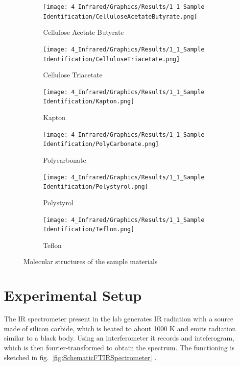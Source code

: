 \documentclass[12pt]{article}
\begin{document}
\begin{figure}[!ht]
    \begin{subfigure}[c]{0.5\textwidth}
        \centering
        \texttt{[image: 4\_Infrared/Graphics/Results/1\_1\_Sample Identification/CelluloseAcetateButyrate.png]}
        \caption{Cellulose Acetate Butyrate}
    \label{fig:StructureCelluloseAcetateButyrate}
    \end{subfigure}
    \hfill
    \begin{subfigure}[c]{0.5\textwidth}
        \centering
        \texttt{[image: 4\_Infrared/Graphics/Results/1\_1\_Sample Identification/CelluloseTriacetate.png]}
        \caption{Cellulose Triacetate}
    \label{fig:StructureCelluloseTriacetate}
    \end{subfigure}
    \hfill
    \begin{subfigure}[c]{0.5\textwidth}
        \centering
        \texttt{[image: 4\_Infrared/Graphics/Results/1\_1\_Sample Identification/Kapton.png]}
        \caption{Kapton}
    \label{fig:StructureKapton}
    \end{subfigure}
    \hfill
    \begin{subfigure}[c]{0.5\textwidth}
        \centering
        \texttt{[image: 4\_Infrared/Graphics/Results/1\_1\_Sample Identification/PolyCarbonate.png]}
        \caption{Polycarbonate}
    \label{fig:StructurePolycarbonate}
    \end{subfigure}
    \hfill
    \begin{subfigure}[c]{0.5\textwidth}
        \centering
        \texttt{[image: 4\_Infrared/Graphics/Results/1\_1\_Sample Identification/Polystyrol.png]}
        \caption{Polystyrol}
    \label{fig:StructurePolystyrol}
    \end{subfigure}
    \hfill
    \begin{subfigure}[c]{0.5\textwidth}
        \centering
        \texttt{[image: 4\_Infrared/Graphics/Results/1\_1\_Sample Identification/Teflon.png]}
        \caption{Teflon}
    \label{fig:StructureTeflon}
    \end{subfigure}
    \caption{Molecular structures of the sample materials}
    \label{fig:MolecularStructures}
\end{figure}
 \FloatBarrier
 
\newpage
\section{Experimental Setup}
The IR spectrometer present in the lab generates IR radiation with a source made of silicon carbide, which is heated to about 1000 \si{\kelvin} and emits radiation similar to a black body. Using an interferometer it records and inteferogram, which is then fourier-transformed to obtain the spectrum. The functioning is sketched in fig.~\ref{fig:SchematicFTIRSpectrometer} \cite{FTIR_Schematic}.
\end{document}
